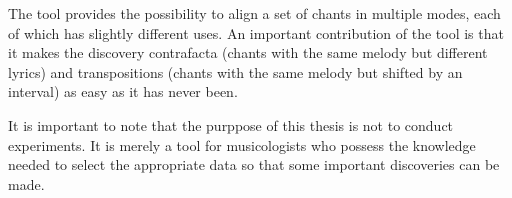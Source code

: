 The tool provides the possibility to align a set of chants in multiple modes, each of which has slightly different uses. An important
contribution of the tool is that it makes the discovery contrafacta (chants with the same melody but different lyrics) and transpositions
(chants with the same melody but shifted by an interval) as easy as it has never been.

It is important to note that the purppose of this thesis is not to conduct experiments. It is merely a tool for musicologists who possess
the knowledge needed to select the appropriate data so that some important discoveries can be made.

